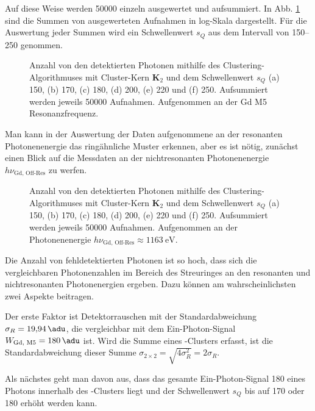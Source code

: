 \noindent
Auf diese Weise werden \SI{50000}{\captures} einzeln ausgewertet und aufsummiert. In Abb. \ref{fig:cl_2_150_170_180_200_220_250_resonance} sind die Summen von ausgewerteten Aufnahmen in log-Skala dargestellt. Für die Auswertung jeder Summen wird ein Schwellenwert $s_Q$ aus dem Intervall von \SIrange{150}{250}{\adu} genommen.
\begin{figure}[H]
    \centering
    
    \caption{Anzahl von den detektierten Photonen mithilfe des Clustering-Algorithmuses mit Cluster-Kern $\mathbf{K}_2$ und dem Schwellenwert $s_Q$ (a) \SI{150}{\adu}, (b) \SI{170}{\adu}, (c) \SI{180}{\adu}, (d) \SI{200}{\adu}, (e) \SI{220}{\adu} und (f) \SI{250}{\adu}. Aufsummiert werden jeweils \num{50000} Aufnahmen. Aufgenommen an der Gd M5 Resonanzfrequenz.}
    \label{fig:cl_2_150_170_180_200_220_250_resonance}
\end{figure}
\noindent
Man kann in der Auswertung der Daten aufgenommene an der resonanten Photonenenergie das ringähnliche Muster erkennen, aber es ist nötig, zunächst einen Blick auf die Messdaten an der nichtresonanten Photonenenergie $h\nu_\text{Gd, Off-Res}$ zu werfen.
\begin{figure}[H]
    \centering
    
    \caption{Anzahl von den detektierten Photonen mithilfe des Clustering-Algorithmuses mit Cluster-Kern $\mathbf{K}_2$ und dem Schwellenwert $s_Q$ (a) \SI{150}{\adu}, (b) \SI{170}{\adu}, (c) \SI{180}{\adu}, (d) \SI{200}{\adu}, (e) \SI{220}{\adu} und (f) \SI{250}{\adu}. Aufsummiert werden jeweils \num{50000} Aufnahmen. Aufgenommen an der Photonenenergie $h\nu_\text{Gd, Off-Res} \approx \SI{1163}{\eV}$.}
    \label{fig:cl_150_170_180_200_220_250_off_resonance}
\end{figure}
\noindent
Die Anzahl von fehldetektierten Photonen ist so hoch, dass sich die vergleichbaren Photonenzahlen im Bereich des Streuringes an den resonanten und nichtresonanten Photonenergien ergeben. Dazu können am wahrscheinlichsten zwei Aspekte beitragen. 

\noindent
Der erste Faktor ist Detektorrauschen mit der Standardabweichung $\sigma_R = \SI{19.94}{\adu}$, die vergleichbar mit dem Ein-Photon-Signal $W_\text{Gd, M5} = \SI{180}{\adu}$ ist. Wird die Summe eines -Clusters erfasst, ist die Standardabweichung dieser Summe $\sigma_{2\times 2} = \sqrt{4\sigma_R^2} = 2\sigma_R$. 

\noindent
Als nächstes geht man davon aus, dass das gesamte Ein-Photon-Signal \SI{180}{\adu} eines Photons innerhalb des -Clusters liegt und der Schwellenwert $s_Q$ bis auf \SI{170}{\adu} oder \SI{180}{\adu} erhöht werden kann.

